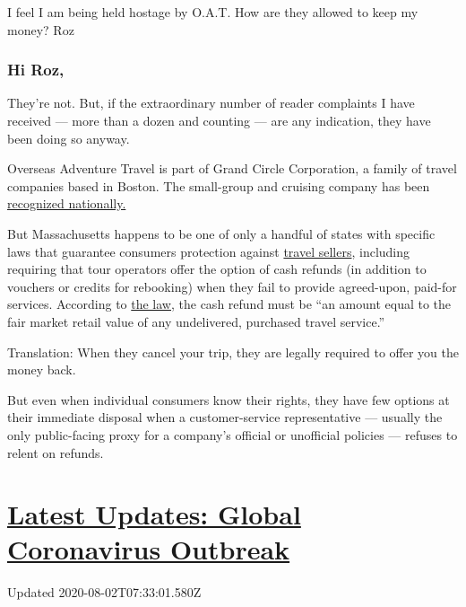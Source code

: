 I feel I am being held hostage by O.A.T. How are they allowed to keep my
money? Roz

\hypertarget{hi-roz}{%
\subsubsection{Hi Roz,}\label{hi-roz}}

They're not. But, if the extraordinary number of reader complaints I
have received --- more than a dozen and counting --- are any indication,
they have been doing so anyway.

Overseas Adventure Travel is part of Grand Circle Corporation, a family
of travel companies based in Boston. The small-group and cruising
company has been
\href{https://www.oattravel.com/oat-difference/awards}{recognized
nationally.}

But Massachusetts happens to be one of only a handful of states with
specific laws that guarantee consumers protection against
\href{https://www.mass.gov/doc/940-cmr-15-the-sale-of-travel-services/download}{travel
sellers}, including requiring that tour operators offer the option of
cash refunds (in addition to vouchers or credits for rebooking) when
they fail to provide agreed-upon, paid-for services. According to
\href{https://www.mass.gov/doc/940-cmr-15-the-sale-of-travel-services/download}{the
law,} the cash refund must be ``an amount equal to the fair market
retail value of any undelivered, purchased travel service.''

Translation: When they cancel your trip, they are legally required to
offer you the money back.

But even when individual consumers know their rights, they have few
options at their immediate disposal when a customer-service
representative --- usually the only public-facing proxy for a company's
official or unofficial policies --- refuses to relent on refunds.

\hypertarget{latest-updates-global-coronavirus-outbreak}{%
\section{\texorpdfstring{\href{https://www.nytimes.com/2020/08/01/world/coronavirus-covid-19.html?action=click\&pgtype=Article\&state=default\&region=MAIN_CONTENT_1\&context=storylines_live_updates}{Latest
Updates: Global Coronavirus
Outbreak}}{Latest Updates: Global Coronavirus Outbreak}}\label{latest-updates-global-coronavirus-outbreak}}

Updated 2020-08-02T07:33:01.580Z

